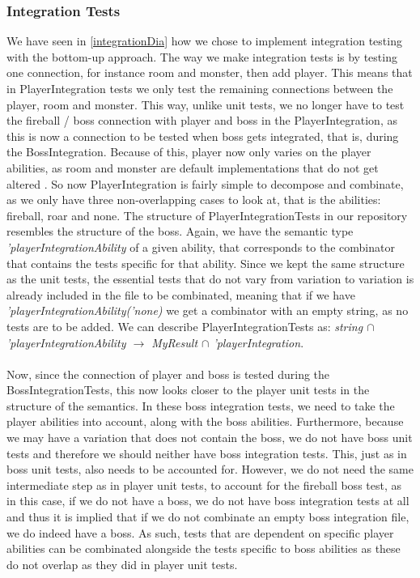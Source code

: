 \subsubsection{Integration Tests}
We have seen in \autoref{integrationDia} how we chose to implement integration testing with the bottom-up approach. The way we make integration tests is by testing one connection, for instance room and monster, then add player. This means that in PlayerIntegration tests we only test the remaining connections between the player, room and monster. This way, unlike unit tests, we no longer have to test the fireball / boss connection with player and boss in the PlayerIntegration, as this is now a connection to be tested when boss gets integrated, that is, during the BossIntegration. Because of this, player now only varies on the player abilities, as room and monster are default implementations that do not get altered . So now PlayerIntegration is fairly simple to decompose and combinate, as we only have three non-overlapping cases to look at, that is the abilities: fireball, roar and none. The structure of PlayerIntegrationTests in our repository resembles the structure of the boss. Again, we have the semantic type \textit{'playerIntegrationAbility} of a given ability, that corresponds to the combinator that contains the tests specific for that ability. Since we kept the same structure as the unit tests, the essential tests that do not vary from variation to variation is already included in the file to be combinated, meaning that if we have \textit{'playerIntegrationAbility('none)} we get a combinator with an empty string, as no tests are to be added. We can describe PlayerIntegrationTests as: \textit{string $\cap$ 'playerIntegrationAbility $\to$ MyResult $\cap$ 'playerIntegration}. \\
\\
Now, since the connection of player and boss is tested during the BossIntegrationTests, this now looks closer to the player unit tests in the structure of the semantics. In these boss integration tests, we need to take the player abilities into account, along with the boss abilities. Furthermore, because we may have a variation that does not contain the boss, we do not have boss unit tests and therefore we should neither have boss integration tests. This, just as in boss unit tests, also needs to be accounted for. However, we do not need the same intermediate step as in player unit tests, to account for the fireball boss test, as in this case, if we do not have a boss, we do not have boss integration tests at all and thus it is implied that if we do not combinate an empty boss integration file, we do indeed have a boss. As such, tests that are dependent on specific player abilities can be combinated alongside the tests specific to boss abilities as these do not overlap as they did in player unit tests. 
